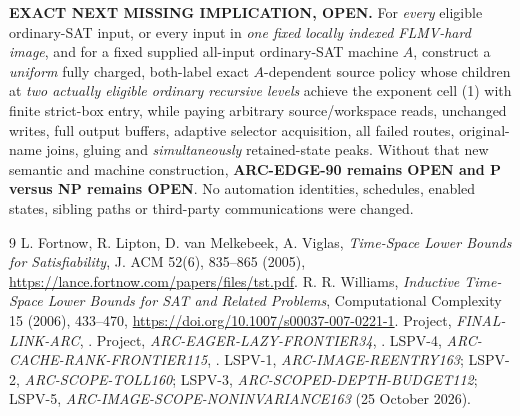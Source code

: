 \documentclass[11pt]{article}
\begin{document}
\noindent\textbf{EXACT NEXT MISSING IMPLICATION, OPEN.}
For \emph{every} eligible ordinary-SAT
input, or every input in \emph{one fixed
locally indexed FLMV-hard image}, and
for a fixed supplied all-input ordinary-SAT
machine $A$, construct a \emph{uniform}
fully charged, both-label exact
$A$-dependent source policy whose
children at \emph{two actually eligible
ordinary recursive levels} achieve
the exponent cell (1) with finite
strict-box entry, while paying
arbitrary source/workspace reads,
unchanged writes, full output buffers,
adaptive selector acquisition, all
failed routes, original-name joins,
gluing and \emph{simultaneously}
retained-state peaks. Without
that new semantic and machine
construction, \textbf{ARC-EDGE-90
remains OPEN and P versus NP remains OPEN}.
No automation identities, schedules,
enabled states, sibling paths or
third-party communications were changed.

\begin{thebibliography}{9}
L. Fortnow, R. Lipton, D. van Melkebeek, A. Viglas,
\emph{Time-Space Lower Bounds for Satisfiability},
J. ACM 52(6), 835--865 (2005),
\url{https://lance.fortnow.com/papers/files/tst.pdf}.
R. R. Williams, \emph{Inductive Time-Space Lower Bounds for
SAT and Related Problems}, Computational Complexity 15 (2006),
433--470, \url{https://doi.org/10.1007/s00037-007-0221-1}.
Project, \emph{FINAL-LINK-ARC},
.
Project, \emph{ARC-EAGER-LAZY-FRONTIER34},
.
LSPV-4, \emph{ARC-CACHE-RANK-FRONTIER115},
.
LSPV-1, \emph{ARC-IMAGE-REENTRY163};
LSPV-2, \emph{ARC-SCOPE-TOLL160};
LSPV-3, \emph{ARC-SCOPED-DEPTH-BUDGET112};
LSPV-5, \emph{ARC-IMAGE-SCOPE-NONINVARIANCE163}
(25 October 2026).
\end{thebibliography}
\end{document}
